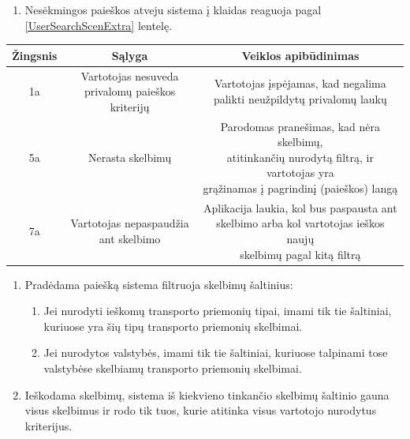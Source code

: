 \documentclass[12pt]{article}
\renewcommand{\thesubsection}{FR\arabic{subsection}}
\renewcommand*{\theenumi}{\thesubsection.\arabic{enumi}}
\begin{document}
	\begin{enumerate}[resume,labelindent=10pt,leftmargin=2.2cm]
		\item Nesėkmingos paieškos atveju sistema į klaidas reaguoja pagal \ref{UserSearchScenExtra} lentelę.
	\end{enumerate}

		\begin{center}
		\begin{tabular}{ | c | c | c | }
			\hline
			Žingsnis & Sąlyga & Veiklos apibūdinimas \\ \hline
			1a       & \makecell{Vartotojas nesuveda \\ privalomų paieškos kriterijų} & \makecell{Vartotojas įspėjamas, kad negalima \\ palikti neužpildytų privalomų laukų} \\ \hline
			5a       & Nerasta skelbimų & \makecell{Parodomas pranešimas, kad nėra skelbimų, \\ atitinkančių nurodytą filtrą, ir vartotojas yra \\ grąžinamas į pagrindinį (paieškos) langą } \\ \hline
			7a       & \makecell{Vartotojas nepaspaudžia \\ ant skelbimo} & \makecell{Aplikacija laukia, kol bus paspausta ant \\ skelbimo arba kol vartotojas ieškos naujų \\ skelbimų pagal kitą filtrą} \\ \hline
		\end{tabular}
		\end{center}
		\pagebreak
		
	\begin{enumerate}[resume,labelindent=10pt,leftmargin=2.2cm]
		\item Pradėdama paiešką sistema filtruoja skelbimų šaltinius:
		
		\begin{enumerate}[label=\theenumi.\arabic{enumii}]
			\item Jei nurodyti ieškomų transporto priemonių tipai, imami tik tie šaltiniai, kuriuose yra šių tipų transporto priemonių skelbimai.
			\item Jei nurodytos valstybės, imami tik tie šaltiniai, kuriuose talpinami tose valstybėse skelbiamų transporto priemonių skelbimai.
		\end{enumerate}				
		
		\item Ieškodama skelbimų, sistema iš kiekvieno tinkančio skelbimų šaltinio gauna visus skelbimus ir rodo tik tuos, kurie atitinka visus vartotojo nurodytus kriterijus.
		
	\end{enumerate}
	\pagebreak
	
\end{document}
